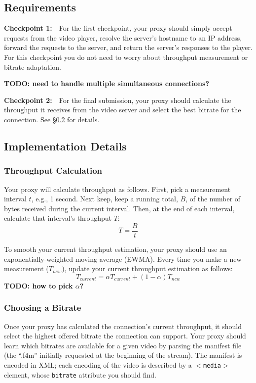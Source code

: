 \documentclass{article}
\begin{document}
\subsection{Requirements}

\bigskip \noindent \textbf{Checkpoint 1:}~~For the first checkpoint, your proxy
should simply accept requests from the video player, resolve the server's
hostname to an IP address, forward the requests to the server, and return the
server's responses to the player. For this checkpoint you do not need to worry
about throughput measurement or bitrate adaptation.

\textbf{TODO: need to handle multiple simultaneous connections?}


\bigskip \noindent \textbf{Checkpoint 2:}~~For the final submission, your proxy
should calculate the throughput it receives from the video server and select
the best bitrate for the connection. See \S\ref{sec:proxy-details} for details.


\subsection{Implementation Details}
\label{sec:proxy-details}

\subsubsection{Throughput Calculation}
Your proxy will calculate throughput as follows. First, pick a measurement
interval $t$, e.g., 1 second. Next keep, keep a running total, $B$, of the
number of bytes received during the current interval. Then, at the end of each
interval, calculate that interval's throughput $T$:
\[
	T = \frac{B}{t}
\]


To smooth your current throughput estimation, your proxy should use an
exponentially-weighted moving average (EWMA). Every time you make a new
measurement ($T_{new}$), update your current throughput estimation as follows:
\[
	T_{current} = \alpha T_{current}  +  (1 - \alpha)T_{new}
\]
\textbf{TODO: how to pick $\alpha$?}



\subsubsection{Choosing a Bitrate}

Once your proxy has calculated the connection's current throughput, it should
select the highest offered bitrate the connection can support. Your proxy
should learn which bitrates are available for a given video by parsing the
manifest file (the ``.f4m'' initially requested at the beginning of the
stream). The manifest is encoded in XML; each encoding of the video is
described by a \texttt{$<$media$>$} element, whose \texttt{bitrate} attribute
you should find.
\end{document}
